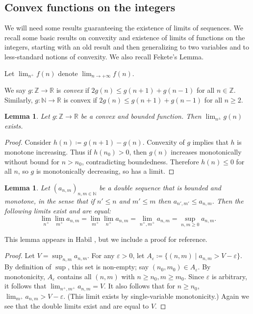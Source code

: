 \documentclass[11pt]{amsart}
\numberwithin{equation}{section}
\numberwithin{figure}{section}
\newtheorem{lemma}[theorem]{Lemma}
\theoremstyle{definition}
\theoremstyle{plain}
\renewcommand{\epsilon}{\varepsilon}
\begin{document}
 \subsection{Convex functions on the integers}
 \label{subsec:convexity}

We will need some results guaranteeing the existence of limits of sequences.
 We recall some basic results on convexity and existence of limits of
 functions on the integers, starting with an old result and then
 generalizing to two variables and to less-standard notions of
 convexity. We also recall Fekete's Lemma.
 
 Let $\lim_{n^{+}}f(n)$ denote $\lim_{n \to +\infty}f(n)$.

 We say $g \colon \mathbb{\mathbb{Z}} \to \mathbb{R}$ is \emph{convex} if $2g(n) \leq g(n+1) + g(n-1)$ for all $n \in \mathbb{Z}$. Similarly, $g \colon \mathbb{N} \to \mathbb{R}$ is convex  if $2g(n) \leq g(n+1) + g(n-1)$ for all $n \geq 2$.

 \begin{lemma}
 Let $g \colon \mathbb{\mathbb{Z}} \to \mathbb{R}$ be a convex and bounded function.
 Then $\lim_{n^{\pm}} g(n)$ exists.
 \label{lem:onevarconvexbounded}
 \end{lemma}
 \begin{proof}
   Consider $h(n) \coloneqq g(n+1) - g(n)$. Convexity of $g$ implies
   that $h$ is monotone increasing. Thus if $h(n_0) > 0$,
   then $g(n)$ increases monotonically without bound for $n > n_0$,
   contradicting boundedness. Therefore $h(n) \le 0$ for all $n$, so $g$ is
   monotonically decreasing, so has a limit.
\end{proof}

  \begin{lemma}\label{lem:monotone-double-limit}
  Let $(a_{n,m})_{n,m \in \mathbb{N}}$ be a double sequence that is
  bounded and monotone, in the sense that if $n' \leq n$ and
  $m' \leq m$ then
  $a_{n',m'} \leq a_{n,m}$. Then the following limits
  exist and are equal:
  \[
  \lim_{n^+}\lim_{m^+} a_{n,m} = \lim_{m^+}\lim_{n^+} a_{n,m} =
    \lim_{n^+, m^+} a_{n,m} = \sup_{n,m \ge 0} a_{n,m}.
  \]
  \end{lemma}
This lemma appears in Habil \cite[Thm.\ 4.2]{Hab16:DoubleSeq}, but we
include a proof for reference.

  \begin{proof}
    Let $V = \sup_{n,m} a_{n,m}$. For any $\epsilon > 0$, let
    $A_\epsilon \coloneqq \{(n,m) \mid a_{n,m} > V - \epsilon\}$. By
    definition of $\sup$, this set is non-empty; say $(n_0,m_0) \in
    A_\epsilon$. By monotonicity, $A_\epsilon$ contains all $(n,m)$
    with $n\ge n_0, m \ge m_0$. Since $\epsilon$ is arbitrary, it
    follows that $\lim_{n^+,m^+} a_{n,m} = V$. It also follows that
    for $n \ge n_0$, $\lim_{m^+} a_{n,m} > V-\epsilon$. (This limit
    exists by single-variable monotonicity.) Again we see that the
    double limits exist and are equal to $V$.
  \end{proof}
\end{document}
